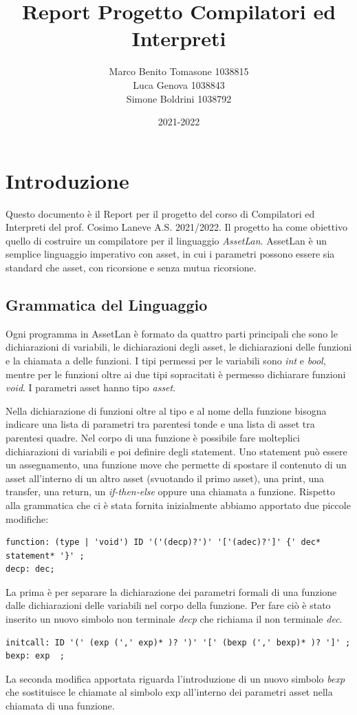 \documentclass[12pt, a4paper]{report}
\title{Report Progetto Compilatori ed Interpreti}
\author{Marco Benito Tomasone 1038815\\
Luca Genova 1038843\\
Simone  Boldrini 1038792}
\date{2021-2022}
\begin{document}
    \maketitle
    \tableofcontents
    \chapter{Introduzione}
    Questo documento è il Report per il progetto del corso di  Compilatori ed Interpreti del prof. Cosimo Laneve A.S. 2021/2022. Il progetto ha come obiettivo quello di costruire un compilatore per il linguaggio \emph{AssetLan}.
    AssetLan è un semplice linguaggio imperativo con asset, in cui i parametri possono  essere sia standard che asset, con ricorsione e senza mutua ricorsione. 
    \section{Grammatica del Linguaggio}
    Ogni programma in AssetLan è formato da quattro parti principali che sono le dichiarazioni di variabili, le dichiarazioni degli asset, le dichiarazioni delle funzioni e la chiamata a delle funzioni. I tipi permessi per le variabili sono  \emph{int} e \emph{bool}, mentre per le funzioni oltre ai due tipi sopracitati è permesso dichiarare funzioni \emph{void}. I parametri asset hanno tipo \emph{asset}. 

    Nella dichiarazione di funzioni oltre al tipo e al nome della funzione bisogna indicare una lista di parametri tra parentesi tonde e una lista di asset tra parentesi quadre. Nel corpo di una funzione è possibile fare molteplici dichiarazioni di variabili e poi definire degli statement. 
    Uno statement può essere un assegnamento, una funzione move che permette di spostare il contenuto di un asset all'interno di un altro asset (svuotando il primo asset), una print, una transfer, una return, un \emph{if-then-else} oppure una chiamata a funzione. 
    Rispetto alla grammatica che ci è stata fornita inizialmente abbiamo apportato due piccole modifiche: 
    \begin{lstlisting}      
function: (type | 'void') ID '('(decp)?')' '['(adec)?']' {' dec* statement* '}' ;
decp: dec;
    \end{lstlisting}  
    La prima è per separare la dichiarazione dei parametri formali di una funzione dalle dichiarazioni delle variabili nel corpo della funzione. Per fare ciò è stato inserito un nuovo simbolo non terminale \emph{decp} che richiama il non terminale \emph{dec}.
    \begin{lstlisting}      
initcall: ID '(' (exp (',' exp)* )? ')' '[' (bexp (',' bexp)* )? ']' ;
bexp: exp  ;
    \end{lstlisting}
La seconda modifica apportata riguarda l'introduzione di un nuovo simbolo \emph{bexp} che sostituisce le chiamate al simbolo exp all'interno dei parametri asset nella chiamata di una funzione. 
\end{document}
